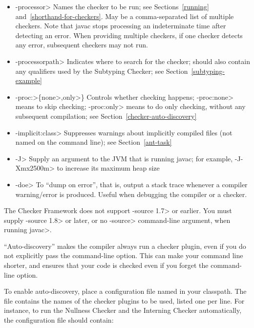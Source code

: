 \begin{itemize}
\item \<-processor> Names the checker to be
  run; see Sections~\ref{running} and~\ref{shorthand-for-checkers}.
  May be a comma-separated list of multiple checkers.  Note that javac
  stops processing an indeterminate time after detecting an error.  When
  providing multiple checkers, if one checker detects any error, subsequent
  checkers may not run.
\item \<-processorpath> Indicates where to search for the
  checker; should also contain any qualifiers used by the Subtyping
  Checker; see Section~\ref{subtyping-example}
\item \<-proc:>\{\<none>,\<only>\} Controls whether checking
  happens; \<-proc:none>
  means to skip checking; \<-proc:only> means to do only
  checking, without any subsequent compilation; see
  Section~\ref{checker-auto-discovery}
\item \<-implicit:class> Suppresses warnings about implicitly compiled files
  (not named on the command line); see Section~\ref{ant-task}
\item \<-J> Supply an argument to the JVM that is running javac;
  for example, \<-J-Xmx2500m> to increase its maximum heap size
\item \<-doe> To ``dump on error'', that is, output a stack trace
  whenever a compiler warning/error is produced. Useful when debugging
  the compiler or a checker.
\end{itemize}

The Checker Framework does not support \<-source 1.7> or earlier.  You must
supply \<-source 1.8> or later, or no \<-source> command-line argument,
when running \<javac>.



``Auto-discovery'' makes the  compiler always run a checker
plugin, even if you do not explicitly pass the 
command-line option.  This can make your command line shorter, and ensures
that your code is checked even if you forget the command-line option.

\begin{sloppypar}
To enable auto-discovery, place a configuration file named
in your classpath.  The file contains the names of the checker plugins to
be used, listed one per line.  For instance, to run the Nullness Checker and the
Interning Checker automatically, the configuration file should contain:
\end{sloppypar}

